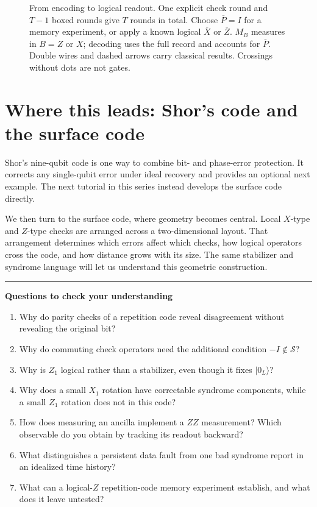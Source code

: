 \documentclass[11pt,a4paper]{article}
\newcommand{\ket}[1]{\lvert #1\rangle}
\begin{document}
\begin{figure}[!ht]
\caption{From encoding to logical readout. One explicit check round and \(T-1\) boxed rounds give \(T\) rounds in total. Choose \(\overline P=I\) for a memory experiment, or apply a known logical \(\overline X\) or \(\overline Z\). \(M_B\) measures in \(B=Z\) or \(X\); decoding uses the full record and accounts for \(\overline P\). Double wires and dashed arrows carry classical results. Crossings without dots are not gates.}\label{fig:qec-lifecycle}
\end{figure}

\section{Where this leads: Shor's code and the surface code}
Shor's nine-qubit code is one way to combine bit- and phase-error protection. It corrects any single-qubit error under ideal recovery and provides an optional next example. The next tutorial in this series instead develops the surface code directly.

We then turn to the surface code, where geometry becomes central.
Local \(X\)-type and \(Z\)-type checks are arranged across a
two-dimensional layout. That arrangement determines which errors
affect which checks, how logical operators cross the code, and how
distance grows with its size. The same stabilizer and syndrome
language will let us understand this geometric construction.

\bigskip\hrule\medskip
\textbf{Questions to check your understanding}
\begin{enumerate}
\item Why do parity checks of a repetition code reveal disagreement without revealing the original bit?
\item Why do commuting check operators need the additional condition $-I\notin\mathcal S$?
\item Why is $Z_1$ logical rather than a stabilizer, even though it fixes $\ket{0_L}$?
\item Why does a small $X_1$ rotation have correctable syndrome components, while a small $Z_1$ rotation does not in this code?
\item How does measuring an ancilla implement a $ZZ$ measurement? Which observable do you obtain by tracking its readout backward?
\item What distinguishes a persistent data fault from one bad syndrome report in an idealized time history?
\item What can a logical-$Z$ repetition-code memory experiment establish, and what does it leave untested?
\end{enumerate}
\end{document}
